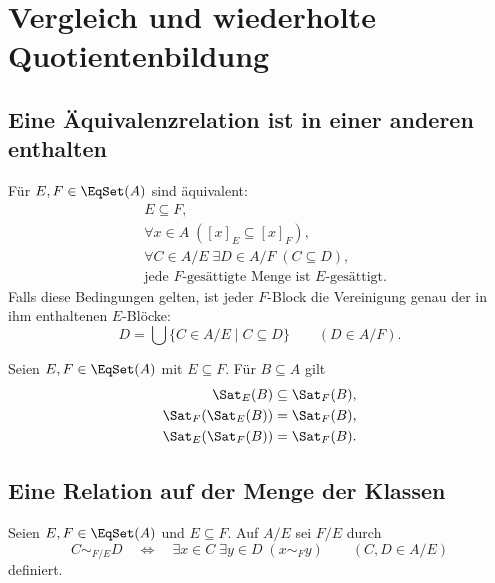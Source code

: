 \chapter{Vergleich und wiederholte Quotientenbildung}
\label{b11guide:ch:quotients}

\section{Eine Äquivalenzrelation ist in einer anderen enthalten}

\begin{theorem}
\label{b11guide:thm:inclusion}
Für $E,F\in\EqSet(A)$ sind äquivalent:
\[
\begin{aligned}
 &E\subseteq F,\\
 &\forall x\in A\;([x]_E\subseteq[x]_F),\\
 &\forall C\in A/E\;\exists D\in A/F\;(C\subseteq D),\\
 &\text{jede }F\text{-gesättigte Menge ist }E\text{-gesättigt}.
\end{aligned}
\]
Falls diese Bedingungen gelten, ist jeder $F$-Block
die Vereinigung genau der in ihm enthaltenen $E$-Blöcke:
\[
 D=\bigcup\{C\in A/E\mid C\subseteq D\}\qquad(D\in A/F).
\]
\end{theorem}

\begin{theorem}
Seien $E,F\in\EqSet(A)$ mit $E\subseteq F$.
Für $B\subseteq A$ gilt
\[
\begin{aligned}
 \Sat_E(B)&\subseteq\Sat_F(B),\\
 \Sat_F(\Sat_E(B))&=\Sat_F(B),\\
 \Sat_E(\Sat_F(B))&=\Sat_F(B).
\end{aligned}
\]
\end{theorem}

\section{Eine Relation auf der Menge der Klassen}

\begin{definition}
\label{b11guide:def:quotientrelation}
Seien $E,F\in\EqSet(A)$ und $E\subseteq F$. Auf $A/E$ sei
$F/E$ durch
\[
 C\sim_{F/E}D
 \quad\Longleftrightarrow\quad
 \exists x\in C\;\exists y\in D\;(x\sim_F y)
 \qquad(C,D\in A/E)
\]
definiert.
\end{definition}


